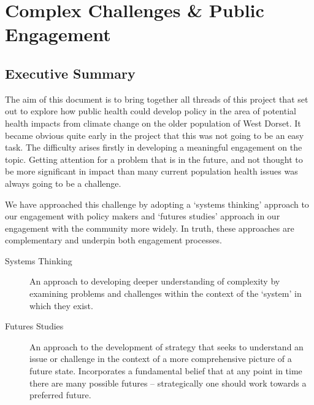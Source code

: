 \chapter{Complex Challenges \& Public Engagement}




\section{Executive Summary}
The aim of this document is to bring together all threads of this project that set out to explore how public health could develop policy in the area of potential health impacts from climate change on the older population of West Dorset. It became obvious quite early in the project that this was not going to be an easy task. The difficulty arises firstly in developing a meaningful engagement on the topic. Getting attention for a problem that is in the future, and not thought to be more significant in impact than many current population health issues was always going to be a challenge.

We have approached this challenge by adopting a `systems thinking' approach to our engagement with policy makers and `futures studies' approach in our engagement with the community more widely. In truth, these approaches are complementary and underpin both engagement processes.

\begin{description}
\item[Systems Thinking]An approach to developing deeper understanding of complexity by examining problems and challenges within the context of the `system' in which they exist.
\item[Futures Studies] An approach to the development of strategy that seeks to understand an issue or challenge in the context of a more comprehensive picture of a future state. Incorporates a fundamental belief that at any point in time there are many possible futures -- strategically one should work towards a preferred future.
\end{description}

